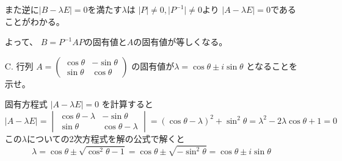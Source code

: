 \documentclass[10pt,a4paper]{ltjsarticle}
\begin{document}
\begin{enumerate}
            また逆に$\lvert B - \lambda E\rvert =0$を満たす$\lambda$は
            $\lvert P\rvert \ne 0, \lvert P^{-1}\rvert \ne 0$より
            $\lvert A - \lambda E\rvert =0$であることがわかる。

            よって、
            $B=P^{-1}AP$の固有値と$A$の固有値が等しくなる。

            \hrulefill
 \item[C. ] 行列
            $A=\begin{pmatrix}
                \cos\theta & -\sin\theta\\ \sin\theta & \cos\theta
               \end{pmatrix}$
            の固有値が$\lambda = \cos\theta \pm i\sin\theta$
            となることを示せ。

            \dotfill

            固有方程式
            $\lvert A - \lambda E\rvert =0$
            を計算すると
            \begin{equation}
             \lvert A - \lambda E\rvert
              =\begin{vmatrix}
                \cos\theta -\lambda & -\sin\theta\\
                \sin\theta & \cos\theta -\lambda
               \end{vmatrix}
               =(\cos\theta -\lambda)^2+\sin^2\theta
               =\lambda^2 -2\lambda\cos\theta +1 =0
            \end{equation}
            この$\lambda$についての2次方程式を解の公式で解くと
            \begin{equation}
             \lambda = \cos\theta \pm \sqrt{\cos^2\theta -1}
              =\cos\theta \pm \sqrt{-\sin^2\theta}
              =\cos\theta \pm i\sin\theta
            \end{equation}
\end{enumerate}
\end{document}
